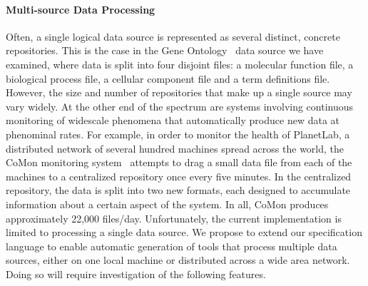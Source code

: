 \documentclass[11pt]{article}
\begin{document}
\paragraph*{Multi-source Data Processing}
Often, a single logical data source is represented
as several distinct, concrete repositories.   This is the case
in the Gene Ontology~\cite{geneontology} data source we have examined,
where data is split into four disjoint 
files: a molecular function file, a biological process file,
a cellular component file and a term definitions file.
However, the size and number of repositories that make up a single source
may vary widely.  At the other end of the spectrum are systems involving
continuous monitoring of widescale phenomena that automatically
produce new data at phenominal rates.  For example, in order to monitor
the health of PlanetLab, a distributed network of several hundred machines
spread across the world, the CoMon monitoring system~\cite{comon} attempts to 
drag a small data file from each of the machines to a centralized repository once every
five minutes.  In the
centralized repository, the data is split into two new formats, each designed to accumulate
information about a certain aspect of the system.  In all, CoMon produces
approximately 22,000 files/day.  Unfortunately, the current \pads{} 
implementation is limited to processing a single data source.
We propose to extend our specification language to enable 
automatic generation of tools
that process multiple data sources, either on one local machine or distributed across a wide area network.  Doing so will require investigation of the 
following features.
\end{document}
